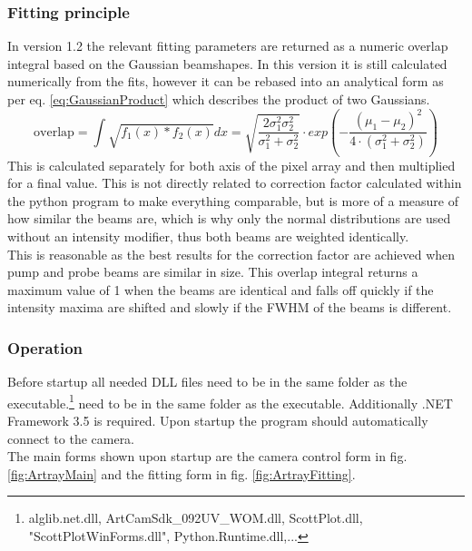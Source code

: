 \documentclass[twoside,openright]{scrreprt}
\begin{document}
\subsubsection{Fitting principle}
In version 1.2 the relevant fitting parameters are returned as a numeric overlap integral based on the Gaussian beamshapes. In this version it is still calculated numerically from the fits, however it can be rebased into an analytical form as per eq. \ref{eq:GaussianProduct} which describes the product of two Gaussians.
\begin{equation}
\mathrm{overlap} = \int \sqrt{f_1(x)*f_2(x)}dx =  \sqrt{\frac{2 \sigma_1^2\sigma_2^2}{\sigma_1^2+\sigma_2^2}}\cdot exp\left(-\frac{\left(\mu_1-\mu_2\right)^2}{4\cdot \left(\sigma_1^2 + \sigma_2^2\right)}\right)\label{eq:GaussianProdcut}
\end{equation}
This is calculated separately for both axis of the pixel array and then multiplied for a final value. 
This is not directly related to correction factor calculated within the python program to make everything comparable, but is more of a measure of how similar the beams are, which is why only the normal distributions are used without an intensity modifier, thus both beams are weighted identically. \\
This is reasonable as the best results for the correction factor are achieved when pump and probe beams are similar in size. This overlap integral returns a maximum value of 1 when the beams are identical and falls off quickly if the intensity maxima are shifted and slowly if the FWHM of the beams is different.\\
\subsubsection{Operation}
Before startup all needed DLL files need to be in the same folder as the executable.\footnote{alglib.net.dll, ArtCamSdk\_092UV\_WOM.dll, ScottPlot.dll, "ScottPlotWinForms.dll", Python.Runtime.dll,...} need to be in the same folder as the executable. Additionally .NET Framework 3.5 is required. Upon startup the program should automatically connect to the camera. \\
The main forms shown upon startup are the camera control form in fig. \ref{fig:ArtrayMain} and the fitting form in fig. \ref{fig:ArtrayFitting}.
\end{document}
